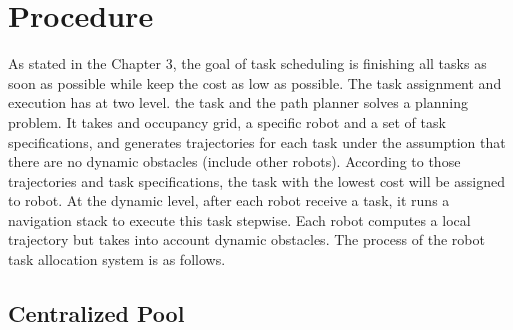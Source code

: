 


\section{Procedure}
\label{sec:task_allocation_procedure}
As stated in the Chapter 3, the goal of task scheduling is finishing all tasks as soon as possible while keep the cost as low as possible. 
The task assignment and execution has at two level. \cite{Ivan2017} the task and the path planner solves a planning problem. It takes and occupancy grid, a specific robot and a set of task specifications, and generates trajectories for each task under the assumption that there are no dynamic obstacles (include other robots). According to those trajectories and task specifications, the task with the lowest cost will be assigned to robot.
At the dynamic level, after each robot receive a task, it runs a navigation stack to execute this task stepwise. Each robot computes a local trajectory but takes into account dynamic obstacles.
The process of the robot task allocation system is as follows.

\subsection{Centralized Pool}


